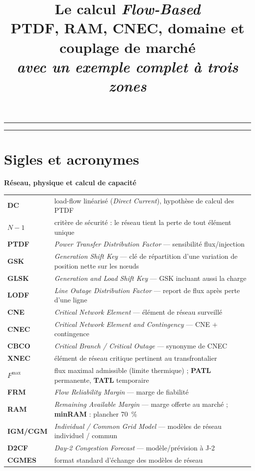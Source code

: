\documentclass[11pt,a4paper]{article}
\title{\vspace{-1.2cm}\textbf{Le calcul \textit{Flow-Based}}\\[2pt]
\large PTDF, RAM, CNEC, domaine et couplage de marché\\[6pt]
\normalsize\textit{avec un exemple complet à trois zones}}
\author{}
\date{}
\newcommand{\Fmax}{F^{\max}}
\begin{document}
\maketitle
\vspace{-1.4cm}
\hrule
\vspace{0.4cm}

\tableofcontents
\vspace{0.6cm}
\hrule

\section*{Sigles et acronymes}

{\small
\renewcommand{\arraystretch}{1.12}
\newcommand{\acg}[1]{\smallskip\noindent\textbf{\textcolor{coreblue}{#1}}\par\nopagebreak}

\acg{Réseau, physique et calcul de capacité}
\begin{tabular}{@{}p{2.6cm}@{\quad}p{11.5cm}@{}}
\textbf{DC}      & load-flow linéarisé (\emph{Direct Current}), hypothèse de calcul des PTDF \\
\textbf{$N\!-\!1$} & critère de sécurité : le réseau tient la perte de tout élément unique \\
\textbf{PTDF}    & \emph{Power Transfer Distribution Factor} — sensibilité flux/injection \\
\textbf{GSK}     & \emph{Generation Shift Key} — clé de répartition d'une variation de position nette sur les n\oe{}uds \\
\textbf{GLSK}    & \emph{Generation and Load Shift Key} — GSK incluant aussi la charge \\
\textbf{LODF}    & \emph{Line Outage Distribution Factor} — report de flux après perte d'une ligne \\
\textbf{CNE}     & \emph{Critical Network Element} — élément de réseau surveillé \\
\textbf{CNEC}    & \emph{Critical Network Element and Contingency} — CNE $+$ contingence \\
\textbf{CBCO}    & \emph{Critical Branch / Critical Outage} — synonyme de CNEC \\
\textbf{XNEC}    & élément de réseau critique pertinent au transfrontalier \\
\textbf{$\Fmax$} & flux maximal admissible (limite thermique) ; \textbf{PATL} permanente, \textbf{TATL} temporaire \\
\textbf{FRM}     & \emph{Flow Reliability Margin} — marge de fiabilité \\
\textbf{RAM}     & \emph{Remaining Available Margin} — marge offerte au marché ; \textbf{minRAM} : plancher 70~\% \\
\textbf{IGM/CGM} & \emph{Individual / Common Grid Model} — modèles de réseau individuel / commun \\
\textbf{D2CF}    & \emph{Day-2 Congestion Forecast} — modèle/prévision à J-2 \\
\textbf{CGMES}   & format standard d'échange des modèles de réseau \\
\end{tabular}

}
\end{document}
